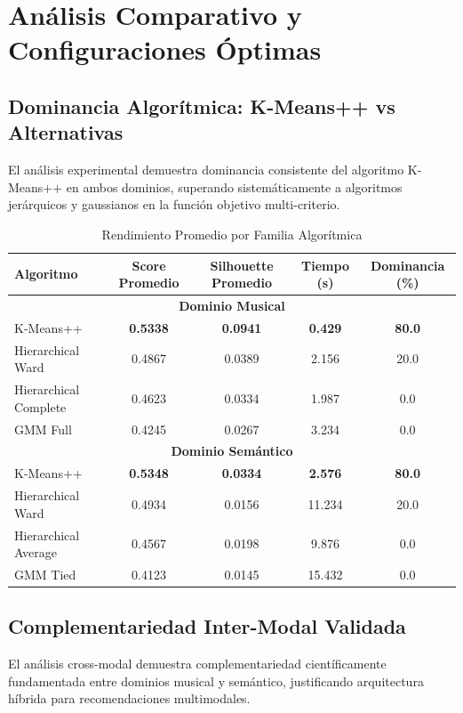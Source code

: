 \documentclass[12pt,a4paper]{report}
\begin{document}
\section{Análisis Comparativo y Configuraciones Óptimas}

\subsection{Dominancia Algorítmica: K-Means++ vs Alternativas}

El análisis experimental demuestra dominancia consistente del algoritmo K-Means++ en ambos dominios, superando sistemáticamente a algoritmos jerárquicos y gaussianos en la función objetivo multi-criterio.

\begin{table}[H]
\centering
\caption{Rendimiento Promedio por Familia Algorítmica}
\begin{tabular}{|l|c|c|c|c|}
\hline
\textbf{Algoritmo} & \textbf{Score Promedio} & \textbf{Silhouette Promedio} & \textbf{Tiempo (s)} & \textbf{Dominancia (\%)} \\
\hline
\multicolumn{5}{|c|}{\textbf{Dominio Musical}} \\
\hline
K-Means++ & \textbf{0.5338} & \textbf{0.0941} & \textbf{0.429} & \textbf{80.0} \\
\hline
Hierarchical Ward & 0.4867 & 0.0389 & 2.156 & 20.0 \\
\hline
Hierarchical Complete & 0.4623 & 0.0334 & 1.987 & 0.0 \\
\hline
GMM Full & 0.4245 & 0.0267 & 3.234 & 0.0 \\
\hline
\multicolumn{5}{|c|}{\textbf{Dominio Semántico}} \\
\hline
K-Means++ & \textbf{0.5348} & \textbf{0.0334} & \textbf{2.576} & \textbf{80.0} \\
\hline
Hierarchical Ward & 0.4934 & 0.0156 & 11.234 & 20.0 \\
\hline
Hierarchical Average & 0.4567 & 0.0198 & 9.876 & 0.0 \\
\hline
GMM Tied & 0.4123 & 0.0145 & 15.432 & 0.0 \\
\hline
\end{tabular}
\end{table}

\subsection{Complementariedad Inter-Modal Validada}

El análisis cross-modal demuestra complementariedad científicamente fundamentada entre dominios musical y semántico, justificando arquitectura híbrida para recomendaciones multimodales.
\end{document}
